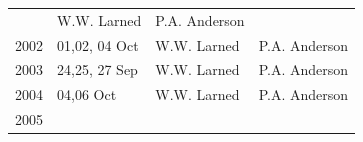 \documentclass[]{article}
\begin{document}
\begin{longtable}[]{@{}llll@{}}
\begin{minipage}[t]{0.38\columnwidth}
\end{minipage} & \begin{minipage}[t]{0.18\columnwidth}\raggedright\strut
W.W. Larned\strut
\end{minipage} & \begin{minipage}[t]{0.20\columnwidth}\raggedright\strut
P.A. Anderson\strut
\end{minipage}\tabularnewline
\begin{minipage}[t]{0.12\columnwidth}\raggedright\strut
2002\strut
\end{minipage} & \begin{minipage}[t]{0.38\columnwidth}\raggedright\strut
01,02, 04 Oct\strut
\end{minipage} & \begin{minipage}[t]{0.18\columnwidth}\raggedright\strut
W.W. Larned\strut
\end{minipage} & \begin{minipage}[t]{0.20\columnwidth}\raggedright\strut
P.A. Anderson\strut
\end{minipage}\tabularnewline
\begin{minipage}[t]{0.12\columnwidth}\raggedright\strut
2003\strut
\end{minipage} & \begin{minipage}[t]{0.38\columnwidth}\raggedright\strut
24,25, 27 Sep\strut
\end{minipage} & \begin{minipage}[t]{0.18\columnwidth}\raggedright\strut
W.W. Larned\strut
\end{minipage} & \begin{minipage}[t]{0.20\columnwidth}\raggedright\strut
P.A. Anderson\strut
\end{minipage}\tabularnewline
\begin{minipage}[t]{0.12\columnwidth}\raggedright\strut
2004\strut
\end{minipage} & \begin{minipage}[t]{0.38\columnwidth}\raggedright\strut
04,06 Oct\strut
\end{minipage} & \begin{minipage}[t]{0.18\columnwidth}\raggedright\strut
W.W. Larned\strut
\end{minipage} & \begin{minipage}[t]{0.20\columnwidth}\raggedright\strut
P.A. Anderson\strut
\end{minipage}\tabularnewline
\begin{minipage}[t]{0.12\columnwidth}\raggedright\strut
2005\strut
\end{minipage} & \begin{minipage}[t]{0.38\columnwidth}\raggedright\strut

\end{minipage}
\end{longtable}
\end{document}
